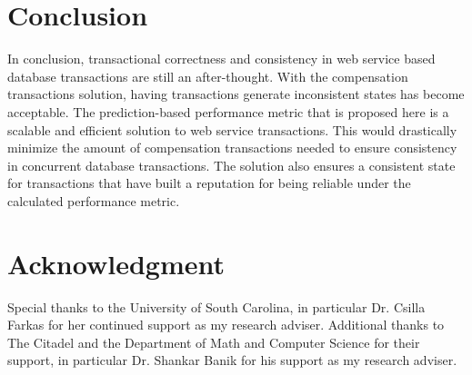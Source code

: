 \documentclass[conference]{IEEEtran}
\begin{document}

%



\section*{Conclusion}
In conclusion, transactional correctness and consistency in web service based database transactions are still an after-thought. With the compensation transactions solution, having transactions generate inconsistent states has become acceptable. The prediction-based performance metric that is proposed here is a scalable and efficient solution to web service transactions. This would drastically minimize the amount of compensation transactions needed to ensure consistency in concurrent database transactions. The solution also ensures a consistent state for transactions that have built a reputation for being reliable under the calculated performance metric.

\section*{Acknowledgment}
Special thanks to the University of South Carolina, in particular Dr. Csilla Farkas for her continued support as my research adviser. Additional thanks to The Citadel and the Department of Math and Computer Science for their support, in particular Dr. Shankar Banik for his support as my research adviser.
\end{document}
